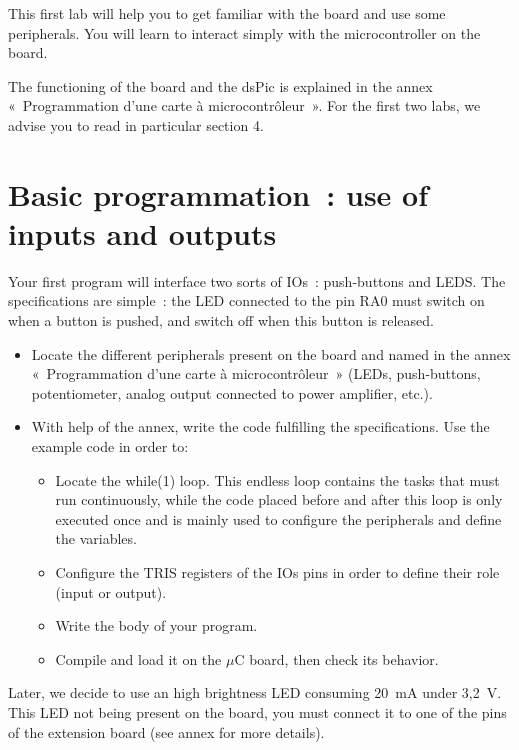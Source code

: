\documentclass[11pt,a4paper]{article}
\theoremstyle{definition}%
\begin{document}
This first lab will help you to get familiar with the board and use some peripherals. You will learn to interact simply with the microcontroller on the board.

The functioning of the board and the dsPic is explained in the annex «~Programmation d’une carte à microcontrôleur~».
For the first two labs, we advise you to read in particular section 4. %


\section{Basic programmation~: use of inputs and outputs}
Your first program will interface two sorts of IOs~: push-buttons and LEDS.
The specifications are simple~: the LED connected to the pin RA0 must switch on when a button is pushed, and switch off when this button is released.

\begin{itemize}
	\item Locate the different peripherals present on the board and named in the annex «~Programmation d’une carte à microcontrôleur~» (LEDs, push-buttons, potentiometer, analog output connected to power amplifier, etc.).
	\item With help of the annex, write the code fulfilling the specifications. Use the example code in order to:
	\begin{itemize}
		\item Locate the while(1) loop.
        This endless loop contains the tasks that must run continuously, while the code placed before and after this loop is only executed once and is mainly used to configure the peripherals and define the variables.
		\item Configure the TRIS registers of the IOs pins in order to define their role (input or output).
		\item Write the body of your program.
		\item Compile and load it on the $\mu$C board, then check its behavior.
	\end{itemize}
\end{itemize}

Later, we decide to use an high brightness LED consuming 20~mA under 3,2~V.
This LED not being present on the board, you must connect it to one of the pins of the extension board (see annex for more details).

\end{document}
